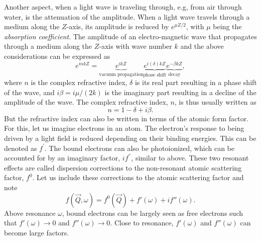 Another aspect, when a light wave is traveling through, e.g, from air through water, is the attenuation of the amplitude. When a light wave travels through a medium along the $Z$-axis, its amplitude is reduced by $e^{\mu Z/2}$, with $\mu$ being the \textit{absorption coefficient}.
The amplitude of an electro-magnetic wave that propagates through a medium along the $Z$-axis with wave number $k$ and the above considerations can be expressed as \citep{Attwood-2007-CUP}
\begin{equation}
e^{i n k Z}= \underbrace{e^{i k Z}}_{\text{vacuum propagation}} \underbrace{e^{i \left(\delta\right)k Z}}_{\text{phase shift}} \underbrace{e^{-\beta k Z}}_{\text{decay}},
\label{eq:wave-in-medium}
\end{equation}
where $n$ is the complex refractive index, $\delta$ is its real part resulting in a phase shift of the wave, and $i \beta=i \mu/(2 k)$ is the imaginary part resulting in a decline of the amplitude of the wave. The complex refractive index, $n$, is thus usually written as
\begin{equation}
n=1-\delta+i\beta.
\label{eq:complex-refractive-index}
\end{equation}
But the refractive index can also be written in terms of the atomic form factor. For this, let us imagine electrons in an atom. The electron's response to being driven by a light field is reduced depending on their binding energies. This can be denoted as $f^{'}$. The bound electrons can also be photoionized, which can be accounted for by an imaginary factor, $i f^{''}$, similar to above. These two resonant effects are called dispersion corrections to the non-resonant atomic scattering factor, $f^{0}$. Let us include these corrections to the atomic scattering factor and note
\begin{equation}
f\left(\vec{Q},\omega\right)=f^{0}\left(\vec{Q}\right)+f'\left(\omega\right)+i f''\left(\omega\right).
\label{eq:scattering-factor-dispersion-corr}
\end{equation}
Above resonance $\omega$, bound electrons can be largely seen as free electrons such that $f'\left(\omega\right)\rightarrow 0$ and $f''\left(\omega\right)\rightarrow 0$. Close to resonance, $f'\left(\omega\right)$ and $f''\left(\omega\right)$ can become large factors.\\[1\baselineskip]
